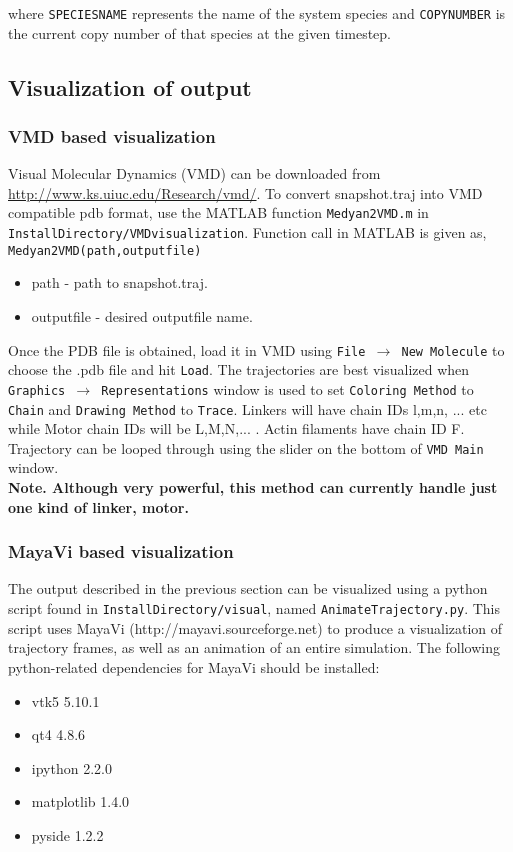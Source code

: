 \documentclass[11pt, oneside]{article}   	%
\begin{document}
\noindent where \texttt{SPECIESNAME} represents the name of the system species and \texttt{COPYNUMBER} is the current copy number of that species at the given timestep.

\subsection{Visualization of output}
\subsubsection{VMD based visualization}
Visual Molecular Dynamics (VMD) can be downloaded from \url{http://www.ks.uiuc.edu/Research/vmd/}. To convert snapshot.traj into VMD compatible pdb format, use the MATLAB function \texttt{Medyan2VMD.m} in \texttt{InstallDirectory/VMDvisualization}.
Function call in MATLAB is given as,\\
\indent \texttt{Medyan2VMD(path,outputfile)}
\begin{itemize}
\item path - path to snapshot.traj.
\item outputfile - desired outputfile name.
\end{itemize}
Once the PDB file is obtained, load it in VMD using \texttt{File $\rightarrow$ New Molecule} to choose the  .pdb file and hit \texttt{Load}. 
The trajectories are best visualized when \texttt{Graphics $\rightarrow$ Representations} window is used to set \texttt{Coloring Method} to \texttt{Chain} and \texttt{Drawing Method} to \texttt{Trace}. Linkers will have chain IDs l,m,n, ... etc while Motor chain IDs will be L,M,N,... . Actin filaments have chain ID F.  Trajectory can be looped through using the slider on the bottom of \texttt{VMD Main} window.\\
\textbf{Note. Although very powerful, this method can currently handle just one kind of linker, motor.}
\subsubsection{MayaVi based visualization}
The output described in the previous section can be visualized using a python script found in \texttt{InstallDirectory/visual}, named \texttt{AnimateTrajectory.py}. This script uses MayaVi (http://mayavi.sourceforge.net) to produce a visualization of trajectory frames, as well as an animation of an entire simulation.
The following python-related dependencies for MayaVi should be installed:
\begin{itemize}
\item vtk5 5.10.1
\item qt4 4.8.6
\item ipython 2.2.0
\item matplotlib 1.4.0
\item pyside 1.2.2
\end{itemize}
\end{document}
